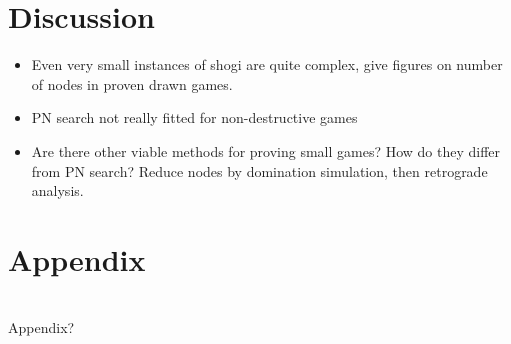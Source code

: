 \documentclass{article}
\begin{document}
\section{Discussion}


\begin{itemize}
	\item Even very small instances of shogi are quite complex, give figures on number of nodes in proven drawn games.
	\item PN search not really fitted for non-destructive games
	\item Are there other viable methods for proving small games? How do they differ from PN search? Reduce nodes by domination simulation, then retrograde analysis.
\end{itemize}

\section{Appendix}
\appendix
\section{}
Appendix?

{}

\end{document}
